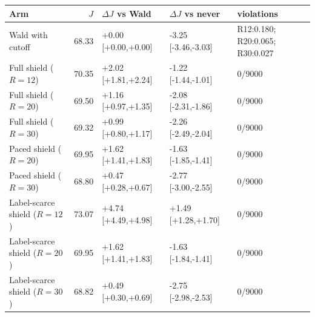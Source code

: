 \begin{tabular}{@{}l r l l l@{}}
\toprule
Arm & $J$ & $\Delta J$ vs Wald & $\Delta J$ vs never & violations \\
\midrule
Wald with cutoff & 68.33 & +0.00 [+0.00,+0.00] & -3.25 [-3.46,-3.03] & R12:0.180; R20:0.065; R30:0.027 \\
Full shield ($R=12$) & 70.35 & +2.02 [+1.81,+2.24] & -1.22 [-1.44,-1.01] & 0/9000 \\
Full shield ($R=20$) & 69.50 & +1.16 [+0.97,+1.35] & -2.08 [-2.31,-1.86] & 0/9000 \\
Full shield ($R=30$) & 69.32 & +0.99 [+0.80,+1.17] & -2.26 [-2.49,-2.04] & 0/9000 \\
Paced shield ($R=20$) & 69.95 & +1.62 [+1.41,+1.83] & -1.63 [-1.85,-1.41] & 0/9000 \\
Paced shield ($R=30$) & 68.80 & +0.47 [+0.28,+0.67] & -2.77 [-3.00,-2.55] & 0/9000 \\
Label-scarce shield ($R=12$) & 73.07 & +4.74 [+4.49,+4.98] & +1.49 [+1.28,+1.70] & 0/9000 \\
Label-scarce shield ($R=20$) & 69.95 & +1.62 [+1.41,+1.83] & -1.63 [-1.84,-1.41] & 0/9000 \\
Label-scarce shield ($R=30$) & 68.82 & +0.49 [+0.30,+0.69] & -2.75 [-2.98,-2.53] & 0/9000 \\
\bottomrule
\end{tabular}
